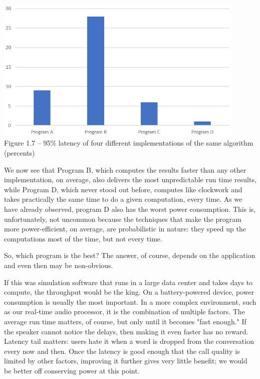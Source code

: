 \hspace*{\fill} \\ %
\begin{center}
\includegraphics[width=0.9\textwidth]{content/1/chapter1/images/7.jpg}\\
Figure 1.7 – 95\% latency of four different implementations of the same algorithm (percents)
\end{center}

We now see that Program B, which computes the results faster than any other implementation, on average, also delivers the most unpredictable run time results, while Program D, which never stood out before, computes like clockwork and takes practically the same time to do a given computation, every time. As we have already observed, program D also has the worst power consumption. This is, unfortunately, not uncommon because the techniques that make the program more power-efficient, on average, are probabilistic in nature: they speed up the computations most of the time, but not every time.

So, which program is the best? The answer, of course, depends on the application and even then may be non-obvious.


If this was simulation software that runs in a large data center and takes days to compute, the throughput would be the king. On a battery-powered device, power consumption is usually the most important. In a more complex environment, such as our real-time audio processor, it is the combination of multiple factors. The average run time matters, of course, but only until it becomes "fast enough." If the speaker cannot notice the delays, then making it even faster has no reward. Latency tail matters: users hate it when a word is dropped from the conversation every now and then. Once the latency is good enough that the call quality is limited by other factors, improving it further gives very little benefit; we would be better off conserving power at this point.

